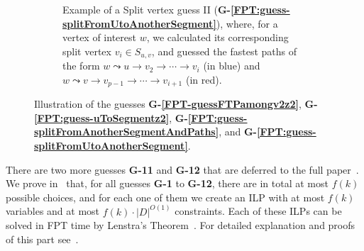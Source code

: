 \documentclass[a4paper,UKenglish,cleveref, autoref, thm-restate]{lipics-v2021}
\newcommand{\ie}{i.\,e.,\ }
\begin{document}
\begin{figure}[t]
\begin{subfigure}[b]{0.48\textwidth}
		\caption{Example of a Split vertex guess II (\textcolor{lipicsGray}{\textsf{\textbf{G-\ref{FPT:guess-splitFromUtoAnotherSegment}}}}), where, for a vertex of interest $w$, 
			we
			calculated its corresponding split vertex $v_i \in S_{u,v}$,
			and guessed the fastest paths of the form
			$w \leadsto u \rightarrow v_2 \rightarrow \cdots \rightarrow v_i$  (in blue) 
			and $w \leadsto v \rightarrow v_{p-1} \rightarrow \cdots \rightarrow v_{i+1}$ (in red). 
			\label{fig:FPT-guessG7}}
	\end{subfigure}
	\caption{Illustration of the guesses \textcolor{lipicsGray}{\textsf{\textbf{G-\ref{FPT-guessFTPamongv2z2}}}}, \textcolor{lipicsGray}{\textsf{\textbf{G-\ref{FPT:guess-uToSegmentz2}}}}, \textcolor{lipicsGray}{\textsf{\textbf{G-\ref{FPT:guess-splitFromAnotherSegmentAndPaths}}}}, and \textcolor{lipicsGray}{\textsf{\textbf{G-\ref{FPT:guess-splitFromUtoAnotherSegment}}}}.}
\end{figure}

There are two more guesses \textcolor{lipicsGray}{\textsf{\textbf{G-11}}} and \textcolor{lipicsGray}{\textsf{\textbf{G-12}}} that are deferred to the full paper~\cite{fullPaper}. 
We prove in~\cite{fullPaper} that, for all guesses \textcolor{lipicsGray}{\textsf{\textbf{G-1}}} to \textcolor{lipicsGray}{\textsf{\textbf{G-12}}}, there are in total at most $f(k)$ possible choices, and for each one of them we create an ILP with at most $f(k)$ variables and at most $f(k)\cdot |D|^{O(1)}$ constraints. Each of these ILPs can be solved in FPT time by Lenstra's Theorem~\cite{Lenstra1983Integer}.
%
For detailed explanation and proofs of this part see~\cite{fullPaper}.
\end{document}
